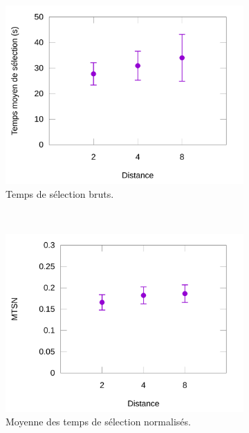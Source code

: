 	\begin{figure}[!htb]
		\begin{subfigure}[t]{0.49\textwidth}
			\centering
			\includegraphics[width=\textwidth]{figures/ch5/ampTimeRes}
			\caption{Temps de sélection bruts.}
			\label{fig:ampTimeRes}
		\end{subfigure}
		~
		\begin{subfigure}[t]{0.49\textwidth}
			\centering
			\includegraphics[width=\textwidth]{figures/ch5/normTimes}
			\caption{Moyenne des temps de sélection normalisés.}
			\label{fig:normTimes}
		\end{subfigure}
		~
		\begin{subfigure}[t]{0.49\textwidth}
			\centering

\end{subfigure}
\end{figure}

